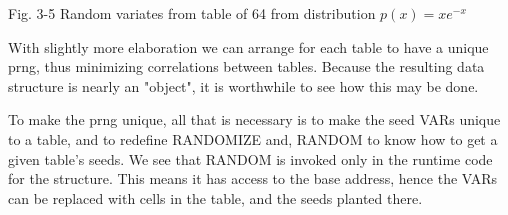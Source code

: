  


 

 

 

 

 

 

 

 

 

 

 

 

Fig. 3-5 Random variates from table of 64 from distribution $p(x)=xe^{-x}$

With slightly more elaboration we can arrange for each table to 
have a unique prng, thus minimizing correlations between
tables. Because the resulting data structure is nearly an "object",
it is worthwhile to see how this may be done.

To make the prng unique, all that is necessary is to make the seed
VARs unique to a table, and to redefine RANDOMIZE and,
RANDOM to know how to get a given table’s seeds. We see that
RANDOM is invoked only in the runtime code for the structure.
This means it has access to the base address, hence the VARs
can be replaced with cells in the table, and the seeds planted there.

